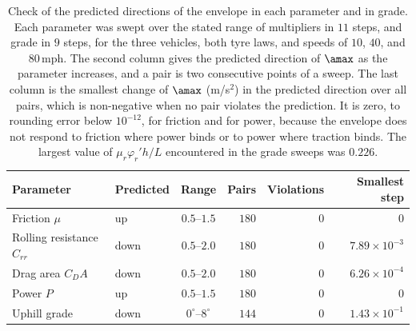 \begin{table}[htbp]
\centering\small
\setlength{\tabcolsep}{5pt}
\caption{Check of the predicted directions of the envelope in each parameter and in grade. Each parameter was swept over the stated range of multipliers in $11$ steps, and grade in $9$ steps, for the three vehicles, both tyre laws, and speeds of $10$, $40$, and $80$\,mph. The second column gives the predicted direction of $\amax$ as the parameter increases, and a pair is two consecutive points of a sweep. The last column is the smallest change of $\amax$ (m/s$^2$) in the predicted direction over all pairs, which is non-negative when no pair violates the prediction. It is zero, to rounding error below $10^{-12}$, for friction and for power, because the envelope does not respond to friction where power binds or to power where traction binds. The largest value of $\mu_r\varphi_r'h/L$ encountered in the grade sweeps was $0.226$.}\label{tab:app-mono}
\begin{tabular}{llcrrr}
\toprule
Parameter & Predicted & Range & Pairs & Violations & Smallest step\\
\midrule
Friction $\mu$ & up & $0.5$--$1.5$ & $180$ & $0$ & $0$\\
Rolling resistance $C_{rr}$ & down & $0.5$--$2.0$ & $180$ & $0$ & $7.89\times10^{-3}$\\
Drag area $C_DA$ & down & $0.5$--$2.0$ & $180$ & $0$ & $6.26\times10^{-4}$\\
Power $P$ & up & $0.5$--$1.5$ & $180$ & $0$ & $0$\\
Uphill grade & down & $0^\circ$--$8^\circ$ & $144$ & $0$ & $1.43\times10^{-1}$\\
\bottomrule
\end{tabular}
\end{table}

